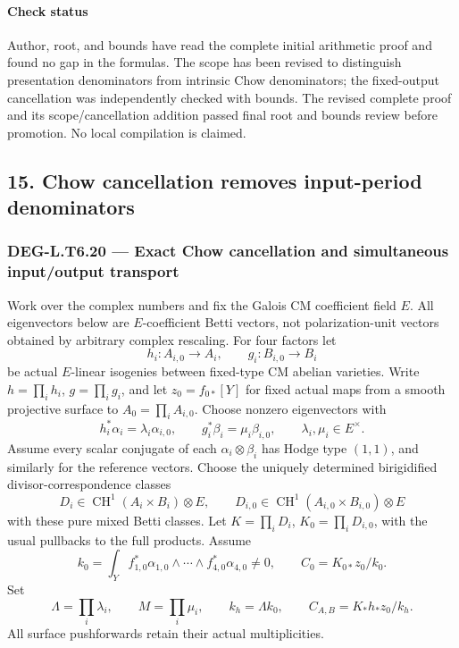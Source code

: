\paragraph{Check status}\label{check-status}

Author, root, and bounds have read the complete initial arithmetic proof and found no gap in the formulas. The scope has been revised to distinguish presentation denominators from intrinsic Chow denominators; the fixed-output cancellation was independently checked with bounds. The revised complete proof and its scope/cancellation addition passed final root and bounds review before promotion. No local compilation is claimed.

\subsection{15. Chow cancellation removes input-period denominators}\label{chow-cancellation-removes-input-period-denominators}

\subsubsection{DEG-L.T6.20 --- Exact Chow cancellation and simultaneous input/output transport}\label{DEG-L.T6.20}

Work over the complex numbers and fix the Galois CM coefficient field \(E\). All eigenvectors below are \(E\)-coefficient Betti vectors, not polarization-unit vectors obtained by arbitrary complex rescaling. For four factors let \[
 h_i:A_{i,0}\longrightarrow A_i,\qquad
 g_i:B_{i,0}\longrightarrow B_i
\] be actual \(E\)-linear isogenies between fixed-type CM abelian varieties. Write \(h=\prod_i h_i\), \(g=\prod_i g_i\), and let \(z_0=f_{0*}[Y]\) for fixed actual maps from a smooth projective surface to \(A_0=\prod_iA_{i,0}\). Choose nonzero eigenvectors with \[
 h_i^*\alpha_i=\lambda_i\alpha_{i,0},\qquad
 g_i^*\beta_i=\mu_i\beta_{i,0},\qquad
 \lambda_i,\mu_i\in E^\times.
 \tag{T20.1}
\] Assume every scalar conjugate of each \(\alpha_i\otimes\beta_i\) has Hodge type \((1,1)\), and similarly for the reference vectors. Choose the uniquely determined birigidified divisor-correspondence classes \[
 D_i\in\operatorname{CH}^1(A_i\times B_i)\otimes E,
 \qquad
 D_{i,0}\in\operatorname{CH}^1(A_{i,0}\times B_{i,0})\otimes E
\] with these pure mixed Betti classes. Let \(K=\prod_iD_i\), \(K_0=\prod_iD_{i,0}\), with the usual pullbacks to the full products. Assume \[
 k_0=\int_Y f_{1,0}^*\alpha_{1,0}\wedge\cdots\wedge
                         f_{4,0}^*\alpha_{4,0}\ne0,
 \qquad C_0=K_{0*}z_0/k_0.
\] Set \[
 \Lambda=\prod_i\lambda_i,\qquad M=\prod_i\mu_i,
 \qquad k_h=\Lambda k_0,\qquad
 C_{A,B}=K_*h_*z_0/k_h.
\] All surface pushforwards retain their actual multiplicities.

